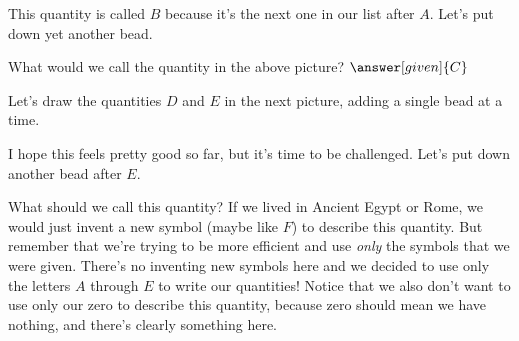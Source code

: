 \documentclass{ximera}
\begin{document}
\begin{image}
\end{image}
This quantity is called $B$ because it's the next one in our list after $A$. Let's put down yet another bead.

\begin{image}
\end{image}

\begin{question}
What would we call the quantity in the above picture? $\answer[given]{C}$
\end{question}

Let's draw the quantities $D$ and $E$ in the next picture, adding a single bead at a time.

\begin{image}
\end{image}

I hope this feels pretty good so far, but it's time to be challenged. Let's put down another bead after $E$.

\begin{image}
\end{image}

What should we call this quantity? If we lived in Ancient Egypt or Rome, we would just invent a new symbol (maybe like $F$) to describe this quantity. But remember that we're trying to be more efficient and use {\em only} the symbols that we were given. There's no inventing new symbols here and we decided to use only the letters $A$ through $E$ to write our quantities! Notice that we also don't want to use only our zero to describe this quantity, because zero should mean we have nothing, and there's clearly something here.
\end{document}
